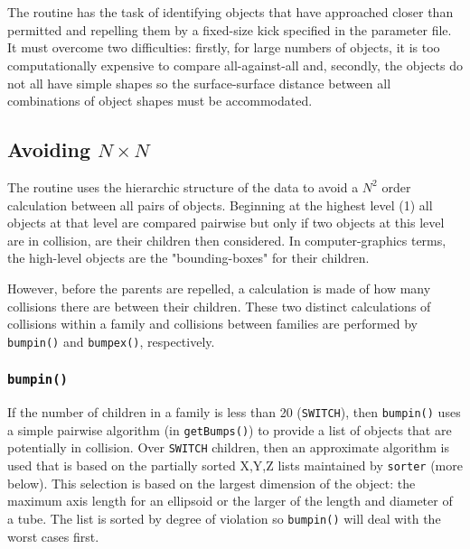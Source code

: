 \section{}

The  routine has the task of identifying objects that have approached closer
than permitted and repelling them by a fixed-size kick specified in the parameter file.
It must overcome two difficulties:  firstly, for large numbers of objects, it is too
computationally expensive to compare all-against-all and, secondly, the objects do not
all have simple shapes so the surface-surface distance between all combinations of
object shapes must be accommodated.

\subsection{Avoiding $N \times N$}

The  routine uses the hierarchic structure of the data to avoid a $N^2$
order calculation between all pairs of objects.  Beginning at the highest level (1)
all objects at that level are compared pairwise but only if two objects at this level
are in collision, are their children then considered.  In computer-graphics terms,
the high-level objects are the "bounding-boxes" for their children. 

However, before the parents are repelled, a calculation is made of how many collisions
there are between their children.  These two distinct calculations of collisions
within a family and collisions between families are performed by {\tt bumpin()}
and {\tt bumpex()}, respectively.

\subsubsection{{\tt bumpin()}}

If the number of children in a family is less than 20 ({\tt SWITCH}), then {\tt bumpin()}
uses a simple pairwise algorithm (in {\tt getBumps()}) to provide a list of objects that
are potentially in collision.  Over {\tt SWITCH} children, then an approximate algorithm
is used that is based on the partially sorted X,Y,Z lists maintained by {\tt sorter} (more
below).  This selection is based on the largest dimension of the object:  the maximum
axis length for an ellipsoid or the larger of the length and diameter of a tube.  The list
is sorted by degree of violation so {\tt bumpin()} will deal with the worst cases first.

